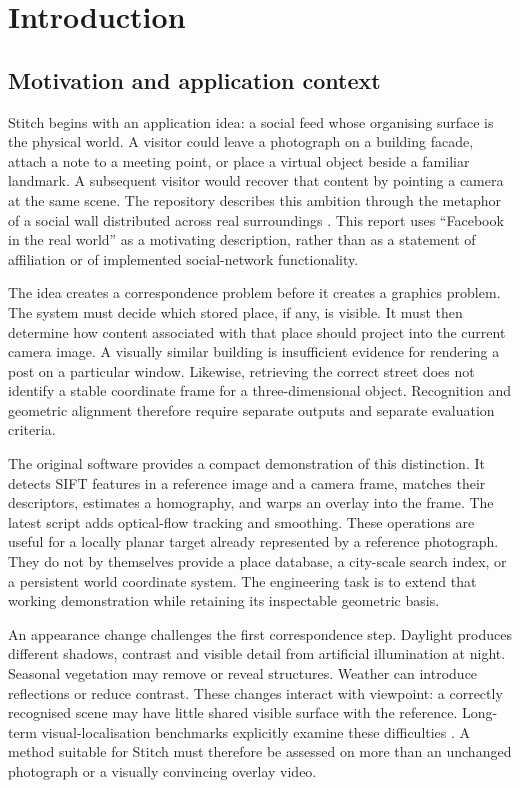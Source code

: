 \chapter{Introduction}\label{ch:introduction}
\section{Motivation and application context}
Stitch begins with an application idea: a social feed whose organising surface is the physical world. A visitor could leave a photograph on a building facade, attach a note to a meeting point, or place a virtual object beside a familiar landmark. A subsequent visitor would recover that content by pointing a camera at the same scene. The repository describes this ambition through the metaphor of a social wall distributed across real surroundings \citep{stitchrepo}. This report uses ``Facebook in the real world'' as a motivating description, rather than as a statement of affiliation or of implemented social-network functionality.

The idea creates a correspondence problem before it creates a graphics problem. The system must decide which stored place, if any, is visible. It must then determine how content associated with that place should project into the current camera image. A visually similar building is insufficient evidence for rendering a post on a particular window. Likewise, retrieving the correct street does not identify a stable coordinate frame for a three-dimensional object. Recognition and geometric alignment therefore require separate outputs and separate evaluation criteria.

The original software provides a compact demonstration of this distinction. It detects SIFT features in a reference image and a camera frame, matches their descriptors, estimates a homography, and warps an overlay into the frame. The latest script adds optical-flow tracking and smoothing. These operations are useful for a locally planar target already represented by a reference photograph. They do not by themselves provide a place database, a city-scale search index, or a persistent world coordinate system. The engineering task is to extend that working demonstration while retaining its inspectable geometric basis.

An appearance change challenges the first correspondence step. Daylight produces different shadows, contrast and visible detail from artificial illumination at night. Seasonal vegetation may remove or reveal structures. Weather can introduce reflections or reduce contrast. These changes interact with viewpoint: a correctly recognised scene may have little shared visible surface with the reference. Long-term visual-localisation benchmarks explicitly examine these difficulties \citep{sattler2018}. A method suitable for Stitch must therefore be assessed on more than an unchanged photograph or a visually convincing overlay video.

